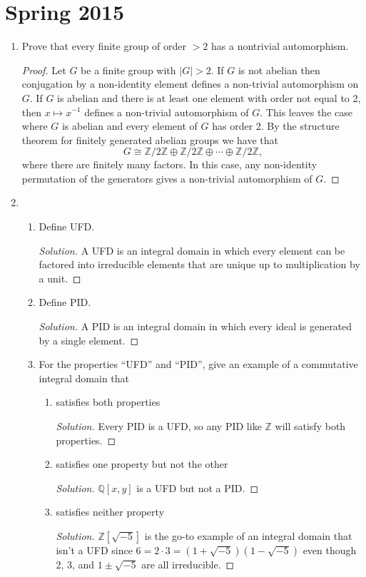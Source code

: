 \documentclass[11pt,letterpaper]{report}
\newcommand{\integers}{\mathbb{Z}}
\newcommand{\rationals}{\mathbb{Q}}
\newenvironment{solution}
{\begin{proof}[Solution]}
{\end{proof}}
\begin{document}
\section{Spring 2015}
\begin{enumerate}
	\item Prove that every finite group of order $>2$ has a nontrivial automorphism.
	\begin{proof}
		Let $G$ be a finite group with $|G|>2$. If $G$ is not abelian then conjugation by a non-identity element defines a non-trivial automorphism on $G$. If $G$ is abelian and there is at least one element with order not equal to 2, then $x\mapsto x^{-1}$ defines a non-trivial automorphism of $G$. This leaves the case where $G$ is abelian and every element of $G$ has order 2. By the structure theorem for finitely generated abelian groups we have that
		\[
		G \cong \integers/2\integers \oplus \integers/2\integers \oplus \cdots \oplus \integers/2\integers,
		\]
		where there are finitely many factors. In this case, any non-identity permutation of the generators gives a non-trivial automorphism of $G$.
	\end{proof}

	\item \begin{enumerate}
		\item Define UFD.
		\begin{solution}
			A UFD is an integral domain in which every element can be factored into irreducible elements that are unique up to multiplication by a unit.
		\end{solution}
		\item Define PID.
		\begin{solution}
			A PID is an integral domain in which every ideal is generated by a single element.
		\end{solution}
		\item For the properties ``UFD'' and ``PID'', give an example of a commutative integral domain that
		\begin{enumerate}
			\item satisfies both properties
			\begin{solution}
				Every PID is a UFD, so any PID like $\integers$ will satisfy both properties.
			\end{solution}
			\item satisfies one property but not the other
			\begin{solution}
				$\rationals[x,y]$ is a UFD but not a PID.
			\end{solution}
			\item satisfies neither property
			\begin{solution}
				$\integers[\sqrt{-5}]$ is the go-to example of an integral domain that isn't a UFD since $6 = 2\cdot 3 = (1+\sqrt{-5})(1-\sqrt{-5})$ even though 2, 3, and $1\pm \sqrt{-5}$ are all irreducible.
			\end{solution}
		\end{enumerate}
	\end{enumerate}


\end{enumerate}
\end{document}
